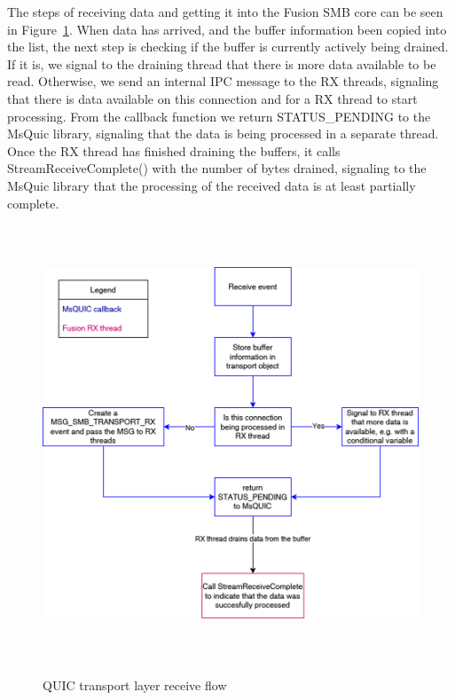 \documentclass[english, 12pt, a4paper, elec, utf8, a-2b, online]{aaltothesis}
\begin{document}
The steps of receiving data and getting it into the Fusion SMB core can be seen in Figure~\ref{fig:msquic_rx}.
When data has arrived, and the buffer information been copied into the list, the
next step is checking if the buffer is currently actively being drained. If it is,
we signal to the draining thread that there is more data available to be read. Otherwise,
we send an internal IPC message to the RX threads, signaling that there is data available
on this connection and for a RX thread to start processing. From the callback function
we return STATUS\_PENDING to the MsQuic library, signaling that the data is being
processed in a separate thread. Once the RX thread has finished draining the buffers,
it calls StreamReceiveComplete() with the number of bytes drained, signaling to the
MsQuic library that the processing of the received data is at least partially complete. 
\begin{figure}[h]
	\centering
	\includegraphics[alt={Block diagram of the flow when receiving data using the MsQuic library}, height=13cm]{./images/receive_flow.png}
	\caption{QUIC transport layer receive flow}
	\label{fig:msquic_rx}
\end{figure}
\end{document}

